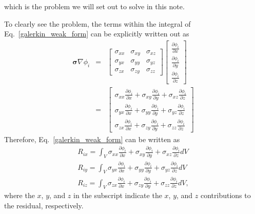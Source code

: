 which is the problem we will set out to solve in this note.

To clearly see the problem, the terms within the integral of Eq.\ \eqref{galerkin_weak_form} can be explicitly written out as
%
\begin{eqnarray}
\pmb{\sigma} \nabla \phi_i &=&
\begin{bmatrix}
\sigma_{xx} & \sigma_{xy} & \sigma_{xz} \\
\sigma_{yx} & \sigma_{yy} & \sigma_{yz} \\
\sigma_{zx} & \sigma_{zy} & \sigma_{zz} 
\end{bmatrix}
%
\begin{bmatrix}
\frac{\partial \phi_i}{\partial x} \\ \frac{\partial \phi_i}{\partial y} \\ \frac{\partial \phi_i}{\partial z}
\end{bmatrix} \nonumber\\
%
&=& 
%
\begin{bmatrix}
\sigma_{xx} \frac{\partial \phi_i}{\partial x} + \sigma_{xy} \frac{\partial \phi_i}{\partial y} + \sigma_{xz} \frac{\partial \phi_i}{\partial z} \\
%
\sigma_{yx} \frac{\partial \phi_i}{\partial x} + \sigma_{yy} \frac{\partial \phi_i}{\partial y} + \sigma_{yz} \frac{\partial \phi_i}{\partial z} \\
%
\sigma_{zx} \frac{\partial \phi_i}{\partial x} + \sigma_{zy} \frac{\partial \phi_i}{\partial y} + \sigma_{zz} \frac{\partial \phi_i}{\partial z} 
\end{bmatrix}
%
\end{eqnarray}
%
Therefore, Eq.\ \eqref{galerkin_weak_form} can be written as
%
\begin{eqnarray}
R_{ix} = \int_V \sigma_{xx} \frac{\partial \phi_i}{\partial x} + \sigma_{xy} \frac{\partial \phi_i}{\partial y} + \sigma_{xz} \frac{\partial \phi_i}{\partial z} dV \nonumber\\
%
R_{iy} = \int_V \sigma_{yx} \frac{\partial \phi_i}{\partial x} + \sigma_{yy} \frac{\partial \phi_i}{\partial y} + \sigma_{yz} \frac{\partial \phi_i}{\partial z} dV \nonumber\\
%
R_{iz} = \int_V \sigma_{zx} \frac{\partial \phi_i}{\partial x} + \sigma_{zy} \frac{\partial \phi_i}{\partial y} + \sigma_{zz} \frac{\partial \phi_i}{\partial z}  dV,
\label{residual_xyz}
\end{eqnarray}
%
where the $x$, $y$, and $z$ in the subscript indicate the $x$, $y$, and $z$ contributions to the residual, respectively.

